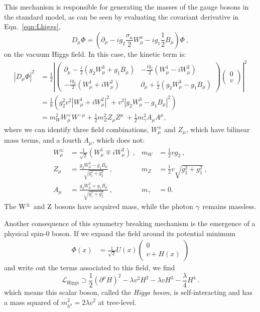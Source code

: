 This mechanism is responsible for generating the masses of the gauge
bosons in the standard model, as can be seen by evaluating the 
covariant derivative in Eqn.~\ref{eqn:Lhiggs},
\begin{equation}
D_{\mu}\Phi = (\partial_{\mu} - i g_2 \frac{\sigma_a}{2}W^a_{\mu} -
ig_1\frac{1}{2}B_{\mu})\Phi ~,
\end{equation}
on the vacuum Higgs field. In this case, the kinetic term is:
\begin{align}
|D_{\mu}\Phi|^2 &= \frac{1}{2} \left|\left (\begin{matrix}\partial_{\mu}
    -\frac{i}{2}(g_2W_{\mu}^3 + g_1B_{\mu})&
    -\frac{ig_2}{2}(W_{\mu}^1-iW_{\mu}^2)\\ 
-\frac{ig_2}{2}(W_{\mu}^1+iW^2_{\mu})&\partial_{\mu}
    +\frac{i}{2}(g_2W_{\mu}^3 - g_1B_{\mu})
  \end{matrix}\right)
                                       \left(\begin{matrix}0\\v\end{matrix}\right)\right |^2 \nonumber\\
& = \frac{1}{8} \left ( g_2^2v^2|W_{\mu}^1+iW^2_{\mu}|^2 +
  v^2|g_2W^3_{\mu}-g_1B_{\mu}|^2 \right ) \nonumber\\
& = m_W^2W_{\mu}^+W^{-\mu} +
\frac{1}{2}m_Z^2Z_{\mu}Z^{\mu}~ + \frac{1}{2}m_{\gamma}^2A_{\mu}A^{\mu},
\end{align}
where we can identify three field combinations, $W_{\mu}^{\pm}$ and
$Z_{\mu}$, which have bilinear mass terms, and a fourth $A_{\mu}$,
which does not:
\begin{align}
W_{\mu}^{\pm} &= \frac{1}{\sqrt{2}}(W_{\mu}^1\mp iW^2_{\mu})~, &m_W &= \frac{1}{2}vg_2~,\\
Z_{\mu} &= \frac{g_2W_{\mu}^3 - g_1B_{\mu}}{\sqrt{g_1^2+g_2^2}}~,&m_Z &= \frac{1}{2}v\sqrt{g_1^2+g_1^2}~,\\
A_{\mu} &= \frac{g_2W_{\mu}^3 + g_1B_{\mu}}{\sqrt{g_1^2+g_2^2}}~,&m_{\gamma} &= 0.
\end{align}
The $\mathrm{W}^{\pm}$ and $\mathrm{Z}$ bosons have acquired mass, while the photon
$\gamma$ remains massless.

Another consequence of this symmetry breaking mechanism is the
emergence of a physical spin-$0$ boson. If we expand the field around
its potential minimum
\begin{align}
\Phi(x)&=
\frac{1}{\sqrt{2}}U(x)\left(\begin{matrix} 0\\v+H(x)\end{matrix} \right)
\end{align}
and write out the terms associated to this field, we find
\begin{equation}
\mathcal L_{\mathrm{Higgs}} \supset \frac{1}{2}(\partial^{\mu}H)^2 -
\lambda v^2 H^2 - \lambda v H^3 - \frac{\lambda}{4}H^4~.
\end{equation}
which means this scalar boson, called the \emph{Higgs boson}, is self-interacting and has a mass squared of $m^2_{h^0} =
2\lambda v^2$ at tree-level.

